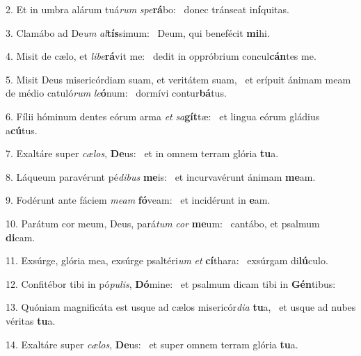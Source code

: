 2. Et in umbra alárum tuá\textit{rum} \textit{spe}\textbf{rá}bo: \ast\  donec tránseat in\textbf{í}quitas.\

3. Clamábo ad De\textit{um} \textit{al}\textbf{tís}simum: \ast\  Deum, qui benefécit \textbf{mi}hi.\

4. Misit de cælo, et \textit{li}\textit{be}\textbf{rá}vit me: \ast\  dedit in oppróbrium concul\textbf{cán}tes me.\

5. Misit Deus misericórdiam suam, et veritátem suam, \dag\  et erípuit ánimam meam de médio catuló\textit{rum} \textit{le}\textbf{ó}num: \ast\  dormívi contur\textbf{bá}tus.\

6. Fílii hóminum dentes eórum arma \textit{et} \textit{sa}\textbf{gít}tæ: \ast\  et lingua eórum gládius a\textbf{cú}tus.\

7. Exaltáre super \textit{cæ}\textit{los}, \textbf{De}us: \ast\  et in omnem terram glória \textbf{tu}a.\

8. Láqueum paravérunt pé\textit{di}\textit{bus} \textbf{me}is: \ast\  et incurvavérunt ánimam \textbf{me}am.\

9. Fodérunt ante fáciem \textit{me}\textit{am} \textbf{fó}veam: \ast\  et incidérunt in \textbf{e}am.\

10. Parátum cor meum, Deus, pará\textit{tum} \textit{cor} \textbf{me}um: \ast\  cantábo, et psalmum \textbf{di}cam.\

11. Exsúrge, glória mea, exsúrge psaltéri\textit{um} \textit{et} \textbf{cí}thara: \ast\  exsúrgam di\textbf{lú}culo.\

12. Confitébor tibi in pó\textit{pu}\textit{lis}, \textbf{Dó}mine: \ast\  et psalmum dicam tibi in \textbf{Gén}tibus:\

13. Quóniam magnificáta est usque ad cælos misericór\textit{di}\textit{a} \textbf{tu}a, \ast\  et usque ad nubes véritas \textbf{tu}a.\

14. Exaltáre super \textit{cæ}\textit{los}, \textbf{De}us: \ast\  et super omnem terram glória \textbf{tu}a.\

